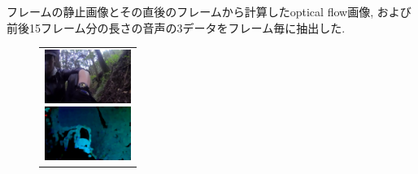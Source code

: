 \documentclass[MIRU,submit]{miru2019j}
\begin{document}
フレームの静止画像とその直後のフレームから計算したoptical flow画像, および前後15フレーム分の長さの音声の3データをフレーム毎に抽出した.


\begin{figure}[tb]
    \begin{tabular}{l}

      \begin{minipage}{0.32\hsize}
        \begin{center}
          \includegraphics[clip, width=2.8cm]{./Figures/still_seevictim3.eps}
        \end{center}
      \end{minipage}

      \begin{minipage}{0.32\hsize}
        \begin{center}
          \includegraphics[clip, width=2.8cm]{./Figures/optic_seevictim3.eps}
        \end{center}
      \end{minipage}


\end{tabular}
\end{figure}
\end{document}
